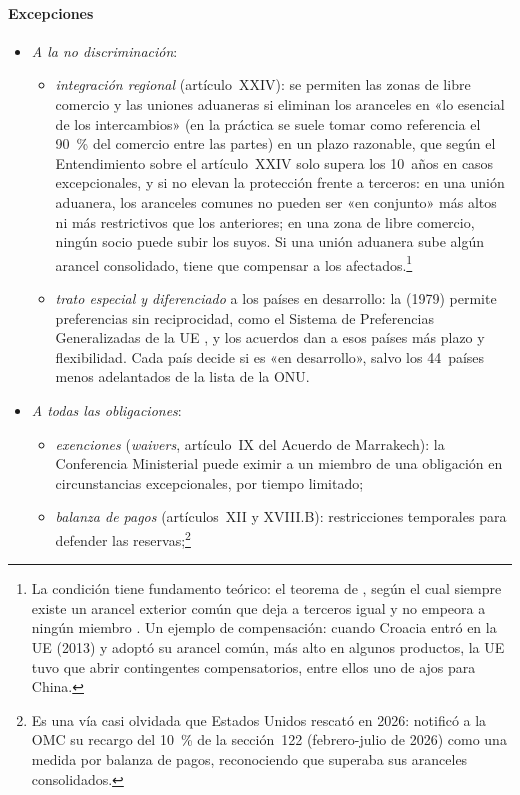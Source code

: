 \documentclass[11pt]{article}
\begin{document}
\paragraph{Excepciones}

\begin{itemize}
\item \emph{A la no discriminación}:
  \begin{itemize}
  \item \emph{integración regional} (artículo~XXIV): se permiten las zonas de libre comercio y las uniones aduaneras si eliminan los aranceles en «lo esencial de los intercambios» (en la práctica se suele tomar como referencia el 90~\% del comercio entre las partes) en un plazo razonable, que según el Entendimiento sobre el artículo~XXIV solo supera los 10~años en casos excepcionales, y si no elevan la protección frente a terceros: en una unión aduanera, los aranceles comunes no pueden ser «en conjunto» más altos ni más restrictivos que los anteriores; en una zona de libre comercio, ningún socio puede subir los suyos. Si una unión aduanera sube algún arancel consolidado, tiene que compensar a los afectados\nocite{GATT1947,OMC1994GATT}.\footnote{La condición tiene fundamento teórico: el teorema de \textcite{KempWan1976Elementary}, según el cual siempre existe un arancel exterior común que deja a terceros igual y no empeora a ningún miembro . Un ejemplo de compensación: cuando Croacia entró en la UE (2013) y adoptó su arancel común, más alto en algunos productos, la UE tuvo que abrir contingentes compensatorios, entre ellos uno de ajos para China.}
  \item \emph{trato especial y diferenciado} a los países en desarrollo: la  (1979) permite preferencias sin reciprocidad, como el Sistema de Preferencias Generalizadas de la UE , y los acuerdos dan a esos países más plazo y flexibilidad. Cada país decide si es «en desarrollo», salvo los 44~países menos adelantados de la lista de la ONU.
  \end{itemize}
\item \emph{A todas las obligaciones}:
  \begin{itemize}
  \item \emph{exenciones} (\emph{waivers}, artículo~IX del Acuerdo de Marrakech): la Conferencia Ministerial puede eximir a un miembro de una obligación en circunstancias excepcionales, por tiempo limitado;
  \item \emph{balanza de pagos} (artículos~XII y XVIII.B): restricciones temporales para defender las reservas;\footnote{Es una vía casi olvidada que Estados Unidos rescató en 2026: notificó a la OMC su recargo del 10~\% de la sección~122 (febrero-julio de 2026) como una medida por balanza de pagos, reconociendo que superaba sus aranceles consolidados\nocite{OMC2026BalanzaPagos}.}

\end{itemize}
\end{itemize}
\end{document}

